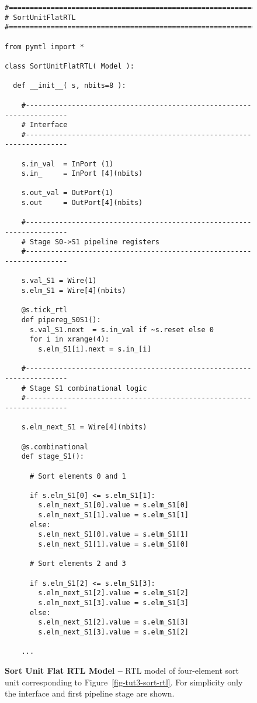 
\begin{figure}

  \begin{lstlisting}[xleftmargin={0.9in}]
#=========================================================================
# SortUnitFlatRTL
#=========================================================================

from pymtl import *

class SortUnitFlatRTL( Model ):

  def __init__( s, nbits=8 ):

    #---------------------------------------------------------------------
    # Interface
    #---------------------------------------------------------------------

    s.in_val  = InPort (1)
    s.in_     = InPort [4](nbits)

    s.out_val = OutPort(1)
    s.out     = OutPort[4](nbits)

    #---------------------------------------------------------------------
    # Stage S0->S1 pipeline registers
    #---------------------------------------------------------------------

    s.val_S1 = Wire(1)
    s.elm_S1 = Wire[4](nbits)

    @s.tick_rtl
    def pipereg_S0S1():
      s.val_S1.next  = s.in_val if ~s.reset else 0
      for i in xrange(4):
        s.elm_S1[i].next = s.in_[i]

    #---------------------------------------------------------------------
    # Stage S1 combinational logic
    #---------------------------------------------------------------------

    s.elm_next_S1 = Wire[4](nbits)

    @s.combinational
    def stage_S1():

      # Sort elements 0 and 1

      if s.elm_S1[0] <= s.elm_S1[1]:
        s.elm_next_S1[0].value = s.elm_S1[0]
        s.elm_next_S1[1].value = s.elm_S1[1]
      else:
        s.elm_next_S1[0].value = s.elm_S1[1]
        s.elm_next_S1[1].value = s.elm_S1[0]

      # Sort elements 2 and 3

      if s.elm_S1[2] <= s.elm_S1[3]:
        s.elm_next_S1[2].value = s.elm_S1[2]
        s.elm_next_S1[3].value = s.elm_S1[3]
      else:
        s.elm_next_S1[2].value = s.elm_S1[3]
        s.elm_next_S1[3].value = s.elm_S1[2]

    ...
\end{lstlisting}

  \caption{\textbf{Sort Unit Flat RTL Model --} RTL model of four-element
    sort unit corresponding to Figure~\ref{fig-tut3-sort-rtl}. For
    simplicity only the interface and first pipeline stage are shown.}
  \label{code-tut3-sort-rtl-flat}

\end{figure}

